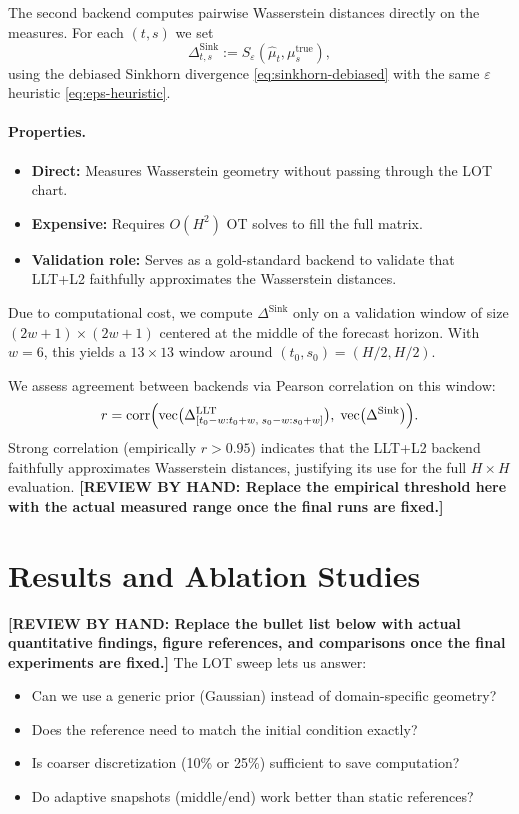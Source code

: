 \documentclass[11pt]{article}
\newcommand{\review}[1]{{\color{red}\textbf{[REVIEW BY HAND: #1]}}}
\newcommand{\1}{\mathbf{1}}
\begin{document}
The second backend computes pairwise Wasserstein distances directly on the measures. For each $(t, s)$ we set
\begin{equation}\label{eq:delta-sinkhorn}
\Delta_{t,s}^{\mathrm{Sink}} := S_\varepsilon(\widehat{\mu}_t, \mu_s^{\text{true}}),
\end{equation}
using the debiased Sinkhorn divergence \eqref{eq:sinkhorn-debiased} with the same $\varepsilon$ heuristic \eqref{eq:eps-heuristic}.

\paragraph{Properties.}
\begin{itemize}
\item \textbf{Direct:} Measures Wasserstein geometry without passing through the LOT chart.
\item \textbf{Expensive:} Requires $O(H^2)$ OT solves to fill the full matrix.
\item \textbf{Validation role:} Serves as a gold-standard backend to validate that LLT+L2 faithfully approximates the Wasserstein distances.
\end{itemize}

Due to computational cost, we compute $\Delta^{\mathrm{Sink}}$ only on a validation window of size $(2w+1) \times (2w+1)$ centered at the middle of the forecast horizon. With $w = 6$, this yields a $13 \times 13$ window around $(t_0,s_0) = (H/2,H/2)$.

We assess agreement between backends via Pearson correlation on this window:
\begin{equation}
r = \mathrm{corr}\Bigl(
\mathrm{vec}\bigl(\Delta^{\mathrm{LLT}}_{[t_0-w:t_0+w,\; s_0-w:s_0+w]}\bigr),\;
\mathrm{vec}\bigl(\Delta^{\mathrm{Sink}}\bigr)
\Bigr).
\end{equation}
Strong correlation (empirically $r > 0.95$) indicates that the LLT+L2 backend faithfully approximates Wasserstein distances, justifying its use for the full $H \times H$ evaluation.
\review{Replace the empirical threshold here with the actual measured range once the final runs are fixed.}



\section{Results and Ablation Studies}
\label{sec:results}
\review{Replace the bullet list below with actual quantitative findings, figure references, and comparisons once the final experiments are fixed.}
The LOT sweep lets us answer:
\begin{itemize}
    \item Can we use a generic prior (Gaussian) instead of domain-specific geometry?
    \item Does the reference need to match the initial condition exactly?
    \item Is coarser discretization (10\% or 25\%) sufficient to save computation?
    \item Do adaptive snapshots (middle/end) work better than static references?
\end{itemize}
\end{document}
